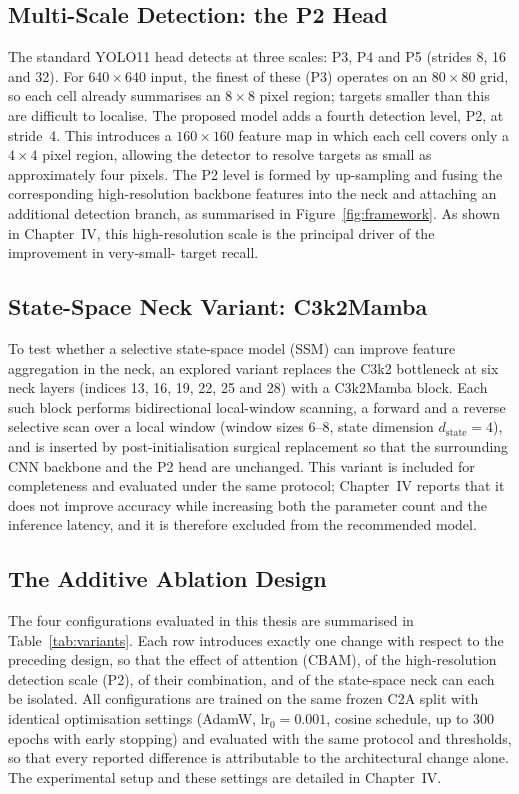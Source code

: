 \subsection{Multi-Scale Detection: the P2 Head}
The standard YOLO11 head detects at three scales: P3, P4 and P5 (strides 8, 16
and 32). For $640 \times 640$ input, the finest of these (P3) operates on an
$80 \times 80$ grid, so each cell already summarises an $8 \times 8$ pixel region;
targets smaller than this are difficult to localise. The proposed model adds a
fourth detection level, P2, at stride~4. This introduces a $160 \times 160$
feature map in which each cell covers only a $4 \times 4$ pixel region, allowing
the detector to resolve targets as small as approximately four pixels. The P2
level is formed by up-sampling and fusing the corresponding high-resolution
backbone features into the neck and attaching an additional detection branch, as
summarised in Figure~\ref{fig:framework}. As shown in Chapter~IV, this
high-resolution scale is the principal driver of the improvement in very-small-%
target recall.

\subsection{State-Space Neck Variant: C3k2Mamba}
\label{sec:mamba}
To test whether a selective state-space model (SSM) can improve feature
aggregation in the neck, an explored variant replaces the C3k2 bottleneck at six
neck layers (indices 13, 16, 19, 22, 25 and 28) with a C3k2Mamba block. Each such
block performs bidirectional local-window scanning, a forward and a reverse
selective scan over a local window (window sizes 6--8, state dimension
$d_{\text{state}} = 4$), and is inserted by post-initialisation surgical
replacement so that the surrounding CNN backbone and the P2 head are unchanged.
This variant is included for completeness and evaluated under the same protocol;
Chapter~IV reports that it does not improve accuracy while increasing both the
parameter count and the inference latency, and it is therefore excluded from the
recommended model.

\subsection{The Additive Ablation Design}
The four configurations evaluated in this thesis are summarised in
Table~\ref{tab:variants}. Each row introduces exactly one change with respect to
the preceding design, so that the effect of attention (CBAM), of the
high-resolution detection scale (P2), of their combination, and of the
state-space neck can each be isolated. All configurations are trained on the same
frozen C2A split with identical optimisation settings (AdamW, $\text{lr}_0 = 0.001$,
cosine schedule, up to 300 epochs with early stopping) and evaluated with the same
protocol and thresholds, so that every reported difference is attributable to the
architectural change alone. The experimental setup and these settings are detailed
in Chapter~IV.

